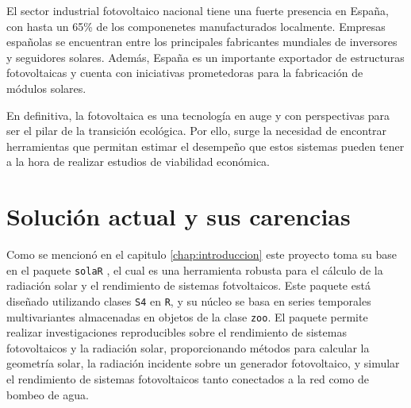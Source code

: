 El sector industrial fotovoltaico nacional tiene una fuerte presencia en España, con hasta un 65\% de los componenetes manufacturados localmente. Empresas españolas se encuentran entre los principales fabricantes mundiales de inversores y seguidores solares. Además, España es un importante exportador de estructuras fotovoltaicas y cuenta con iniciativas prometedoras para la fabricación de módulos solares.

En definitiva, la fotovoltaica es una tecnología en auge y con perspectivas para ser el pilar de la transición ecológica. Por ello, surge la necesidad de encontrar herramientas que permitan estimar el desempeño que estos sistemas pueden tener a la hora de realizar estudios de viabilidad económica.

\section{Solución actual y sus carencias}
\label{sec:org03b0c85}
Como se mencionó en el capitulo \ref{chap:introduccion} este proyecto toma su base en el paquete \texttt{solaR} \cite{perpinan12}, el cual es una herramienta robusta para el cálculo de la radiación solar y el rendimiento de sistemas fotvoltaicos. Este paquete está diseñado utilizando clases \texttt{S4} en \texttt{R}, y su núcleo se basa en series temporales multivariantes almacenadas en objetos de la clase \texttt{zoo}. El paquete permite realizar investigaciones reproducibles sobre el rendimiento de sistemas fotovoltaicos y la radiación solar, proporcionando métodos para calcular la geometría solar, la radiación incidente sobre un generador fotovoltaico, y simular el rendimiento de sistemas fotovoltaicos tanto conectados a la red como de bombeo de agua.

